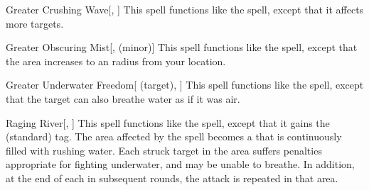 \lowercase{\hypertarget{spell:Greater Crushing Wave}{}}\label{spell:Greater Crushing Wave}
\begin{freeability}[Rank 4]{\hypertarget{spell:Greater Crushing Wave}{Greater Crushing Wave}}[, ]
This spell functions like the  spell, except that it affects more targets.
\end{freeability}
\vspace{0.25em}



\lowercase{\hypertarget{spell:Greater Obscuring Mist}{}}\label{spell:Greater Obscuring Mist}
\begin{freeability}[Rank 4]{\hypertarget{spell:Greater Obscuring Mist}{Greater Obscuring Mist}}[,  (minor)]
\targetrule
This spell functions like the  spell, except that the area increases to an \arealarge radius  from your location.
\end{freeability}
\vspace{0.25em}



\lowercase{\hypertarget{spell:Greater Underwater Freedom}{}}\label{spell:Greater Underwater Freedom}
\begin{attuneability}[Rank 4]{\hypertarget{spell:Greater Underwater Freedom}{Greater Underwater Freedom}}[ (target), ]
This spell functions like the  spell, except that the target can also breathe water as if it was air.
\end{attuneability}
\vspace{0.25em}



\lowercase{\hypertarget{spell:Raging River}{}}\label{spell:Raging River}
\begin{freeability}[Rank 4]{\hypertarget{spell:Raging River}{Raging River}}[, ]
This spell functions like the  spell, except that it gains the  (standard) tag.
The area affected by the spell becomes a  that is continuously filled with rushing water.
Each struck target in the area suffers penalties appropriate for fighting underwater, and may be unable to breathe.
In addition, at the end of each  in subsequent rounds, the attack is repeated in that area.
\end{freeability}
\vspace{0.25em}



